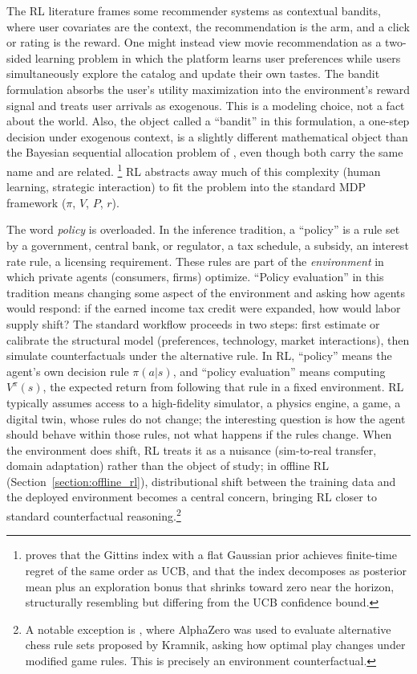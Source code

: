 The RL literature frames some recommender systems as contextual bandits, where user covariates are the context, the recommendation is the arm, and a click or rating is the reward. One might instead view movie recommendation as a two-sided learning problem in which the platform learns user preferences while users simultaneously explore the catalog and update their own tastes. The bandit formulation absorbs the user's utility maximization into the environment's reward signal and treats user arrivals as exogenous. This is a modeling choice, not a fact about the world. Also, the object called a ``bandit'' in this formulation, a one-step decision under exogenous context, is a slightly different mathematical object than the Bayesian sequential allocation problem of \citet{Gittins1979}, even though both carry the same name and are related. \footnote{\citet{Lattimore2016gittins} proves that the Gittins index with a flat Gaussian prior achieves finite-time regret of the same order as UCB, and that the index decomposes as posterior mean plus an exploration bonus that shrinks toward zero near the horizon, structurally resembling but differing from the UCB confidence bound.} RL abstracts away much of this complexity (human learning, strategic interaction) to fit the problem into the standard MDP framework ($\pi$, $V$, $P$, $r$).

The word \textit{policy} is overloaded. In the inference tradition, a ``policy'' is a rule set by a government, central bank, or regulator, a tax schedule, a subsidy, an interest rate rule, a licensing requirement. These rules are part of the \textit{environment} in which private agents (consumers, firms) optimize. ``Policy evaluation'' in this tradition means changing some aspect of the environment and asking how agents would respond: if the earned income tax credit were expanded, how would labor supply shift? The standard workflow proceeds in two steps: first estimate or calibrate the structural model (preferences, technology, market interactions), then simulate counterfactuals under the alternative rule. In RL, ``policy'' means the agent's own decision rule $\pi(a|s)$, and ``policy evaluation'' means computing $V^\pi(s)$, the expected return from following that rule in a fixed environment. RL typically assumes access to a high-fidelity simulator, a physics engine, a game, a digital twin, whose rules do not change; the interesting question is how the agent should behave within those rules, not what happens if the rules change. When the environment does shift, RL treats it as a nuisance (sim-to-real transfer, domain adaptation) rather than the object of study; in offline RL (Section~\ref{section:offline_rl}), distributional shift between the training data and the deployed environment becomes a central concern, bringing RL closer to standard counterfactual reasoning.\footnote{A notable exception is \citet{Tomasev2020}, where AlphaZero was used to evaluate alternative chess rule sets proposed by Kramnik, asking how optimal play changes under modified game rules. This is precisely an environment counterfactual.}

